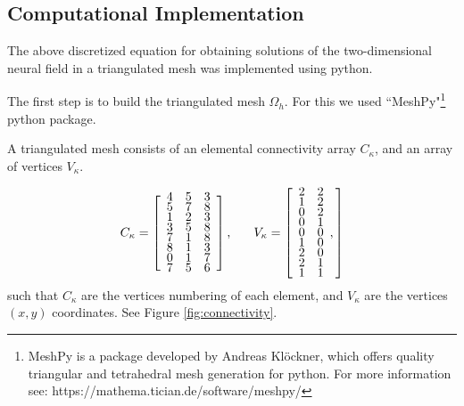 \documentclass{uonmathreport}
\begin{document}
\subsection{Computational Implementation}
\label{subsec:tri_comp_implem}

The above discretized equation for obtaining solutions of the two-dimensional neural field in a triangulated mesh was implemented using python.

The first step is to build the triangulated mesh $\Omega_h$. For this we used ``MeshPy"\footnote{MeshPy is a package developed by Andreas Kl\"ockner, which offers quality triangular and tetrahedral mesh generation for python. For more information see: https://mathema.tician.de/software/meshpy/} python package.

A triangulated mesh consists of an elemental connectivity array $C_{\kappa}$, and an array of vertices $V_{\kappa}$.

\begin{equation} \renewcommand{\arraystretch}{0.5}
C_{\kappa} = \left[ 
 	\begin{array}{ccc}
	4& 5& 3\\
	5& 7& 8\\
	1& 2& 3\\
	3& 5& 8\\
	7& 1& 8\\
	8& 1& 3\\
	0& 1& 7\\
	7& 5& 6\\
	\end{array} 
\right],
%
\hspace{6mm}
V_{\kappa}=\left[ 
	\begin{array}{cc}
	 2 & 2 \\
	 1 & 2 \\
	0 & 2 \\
	0 & 1 \\
	0 & 0 \\
	1 & 0 \\
	2 & 0 \\
	2 & 1 \\
	1 & 1
	\end{array} ,
\right]
\end{equation}
such that $C_{\kappa}$ are the vertices numbering of each element, and $V_{\kappa}$ are the vertices $(x,y)$ coordinates. See Figure \ref{fig:connectivity}.
\end{document}
